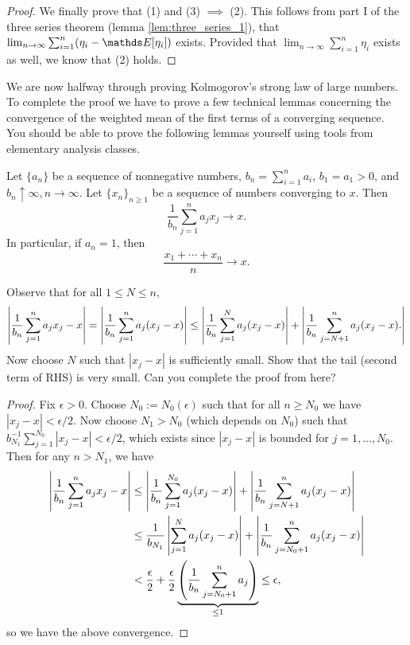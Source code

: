 \begin{unexaminable}
\begin{proof}
We finally prove that (1) and (3) $\implies$ (2). This follows from part I of the three series theorem (lemma \ref{lem:three_series_1}), that $\lim_{n\to\infty} \sum_{i=1}^n (\eta_i - \E[\eta_i])$ exists. Provided that $\lim_{n\to\infty} \sum_{i=1}^n \eta_i$ exists as well, we know that (2) holds.
\end{proof}
\end{unexaminable}

We are now halfway through proving Kolmogorov's strong law of large numbers. To complete the proof we have to prove a few technical lemmas concerning the convergence of the weighted mean of the first terms of a converging sequence. You should be able to prove the following lemmas yourself using tools from elementary analysis classes.

\begin{lemma}[Toeplitz] \label{lem:Toeplitz}
Let $\{a_n\}$ be a sequence of nonnegative numbers, $b_n = \sum_{i=1}^n a_i$, $b_1 = a_1 > 0$, and $b_n \uparrow \infty, n \to \infty$. Let $\{ x_n \}_{n \ge 1}$ be a sequence of numbers converging to $x$. Then
\begin{equation*}
    \frac{1}{b_n} \sum_{j=1}^n a_j x_j \to x.
\end{equation*}
In particular, if $a_n = 1$, then
\begin{equation*}
    \frac{x_1 + \cdots + x_n}{n} \to x.
\end{equation*}
\end{lemma}

\begin{hint}
Observe that for all $1 \leq N \leq n$,
\begin{equation*}
\left| \frac{1}{b_n}\sum_{j=1}^n a_j x_j - x \right| = \left| \frac{1}{b_n}\sum_{j=1}^n a_j(x_j - x) \right| \leq \left| \frac{1}{b_n}\sum_{j=1}^N a_j(x_j - x) \right| + \left| \frac{1}{b_n}\sum_{j=N+1}^n a_j(x_j - x). \right|
\end{equation*}
Now choose $N$ such that $|x_j - x|$ is sufficiently small. Show that the tail (second term of RHS) is very small. Can you complete the proof from here?
\end{hint}

\begin{proof}
Fix $\epsilon > 0$. Choose $N_0 := N_0(\epsilon)$ such that for all $n \geq N_0$ we have $|x_j - x| < \epsilon/2$. Now choose $N_1 > N_0$ (which depends on $N_0$) such that $b_{N_1}^{-1} \sum_{j=1}^{N_0} |x_j - x| < \epsilon/2$, which exists since $|x_j - x|$ is bounded for $j = 1,...,N_0$. Then for any $n > N_1$, we have
\begin{align*}
\left| \frac{1}{b_n}\sum_{j=1}^n a_j x_j - x \right| &\leq \left| \frac{1}{b_n}\sum_{j=1}^{N_0} a_j(x_j - x) \right| + \left| \frac{1}{b_n}\sum_{j=N+1}^n a_j(x_j - x) \right| \\
&\leq \frac{1}{b_{N_1}} \left| \sum_{j=1}^N a_j(x_j - x) \right| + \left| \frac{1}{b_n}\sum_{j={N_0}+1}^n a_j(x_j - x) \right|\\
&< \frac{\epsilon}{2} + \frac{\epsilon}{2} \underbrace{\left( \frac{1}{b_n} \sum_{j=N_0+1}^n a_j \right)}_{\leq 1} \leq \epsilon,
\end{align*}
so we have the above convergence.
\end{proof}

